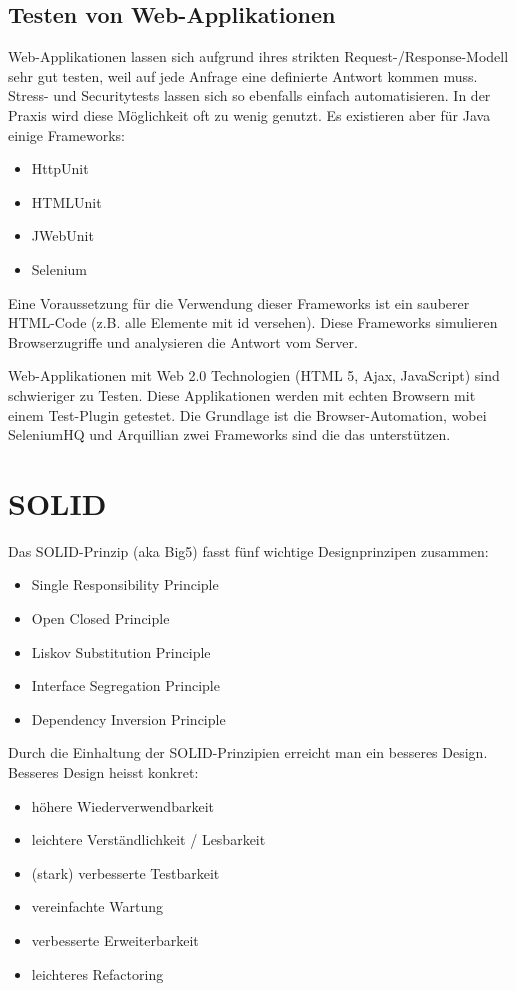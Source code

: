 \subsection{Testen von Web-Applikationen}

Web-Applikationen lassen sich aufgrund ihres strikten Request-/Response-Modell sehr gut testen, weil auf jede Anfrage eine definierte Antwort kommen muss. Stress- und Securitytests lassen sich so ebenfalls einfach automatisieren. In der Praxis wird diese Möglichkeit oft zu wenig genutzt. Es existieren aber für Java einige Frameworks:
\begin{itemize}
	\item HttpUnit
	\item HTMLUnit
	\item JWebUnit
	\item Selenium
\end{itemize}
Eine Voraussetzung für die Verwendung dieser Frameworks ist ein sauberer HTML-Code (z.B. alle Elemente mit id versehen). Diese Frameworks simulieren Browserzugriffe und analysieren die Antwort vom Server.
 
Web-Applikationen mit Web 2.0 Technologien (HTML 5, Ajax, JavaScript) sind schwieriger zu Testen. Diese Applikationen werden mit echten Browsern mit einem Test-Plugin getestet. Die Grundlage ist die Browser-Automation, wobei SeleniumHQ und Arquillian zwei Frameworks sind die das unterstützen. 

\section{SOLID}

Das SOLID-Prinzip (aka Big5) fasst fünf wichtige Designprinzipen zusammen:
\begin{itemize}
	\item Single Responsibility Principle
	\item Open Closed Principle
	\item Liskov Substitution Principle
	\item Interface Segregation Principle
	\item Dependency Inversion Principle
\end{itemize}
Durch die Einhaltung der SOLID-Prinzipien erreicht man ein besseres Design. Besseres Design heisst konkret:
\begin{itemize}
	\item höhere Wiederverwendbarkeit
	\item leichtere Verständlichkeit / Lesbarkeit
	\item (stark) verbesserte Testbarkeit
	\item vereinfachte Wartung
	\item verbesserte Erweiterbarkeit
	\item leichteres Refactoring
\end{itemize}

